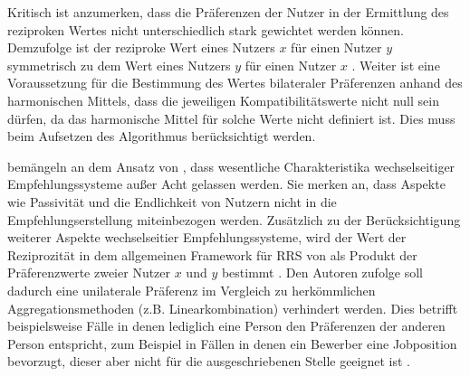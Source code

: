 
Kritisch ist anzumerken, dass die Präferenzen der Nutzer in der Ermittlung des reziproken Wertes nicht unterschiedlich stark gewichtet werden können.
Demzufolge ist der reziproke Wert eines Nutzers $x$ für einen Nutzer $y$ symmetrisch zu dem Wert eines Nutzers $y$ für einen Nutzer $x$ \cite[S. 211]{pizzato:2010}.
Weiter ist eine Voraussetzung für die Bestimmung des Wertes bilateraler Präferenzen anhand des harmonischen Mittels, dass die jeweiligen Kompatibilitätswerte nicht null sein dürfen, da das harmonische Mittel für solche Werte nicht definiert ist.
Dies muss beim Aufsetzen des Algorithmus berücksichtigt werden.

\textcite[S. 40]{li:inproceedings} bemängeln an dem Ansatz von \textcite[S. 207ff.]{pizzato:2010}, dass wesentliche Charakteristika wechselseitiger Empfehlungssysteme außer Acht gelassen werden.
Sie merken an, dass Aspekte wie Passivität und die Endlichkeit von Nutzern nicht in die Empfehlungserstellung miteinbezogen werden.
Zusätzlich zu der Berücksichtigung weiterer Aspekte wechselseitier Empfehlungssysteme, wird der Wert der Reziprozität in dem allgemeinen Framework für \ac{RRS} von \textcite[S. 38]{li:inproceedings} als Produkt der Präferenzwerte zweier Nutzer $x$ und $y$ bestimmt \cite[S. 710]{kumari:article}.
Den Autoren zufolge soll dadurch eine unilaterale Präferenz im Vergleich zu herkömmlichen Aggregationsmethoden (z.B. Linearkombination) verhindert werden.
Dies betrifft beispielsweise Fälle in denen lediglich eine Person den Präferenzen der anderen Person entspricht, zum Beispiel in Fällen in denen ein Bewerber eine Jobposition bevorzugt, dieser aber nicht für die ausgeschriebenen Stelle geeignet ist \cite[S. 38]{li:inproceedings}.

